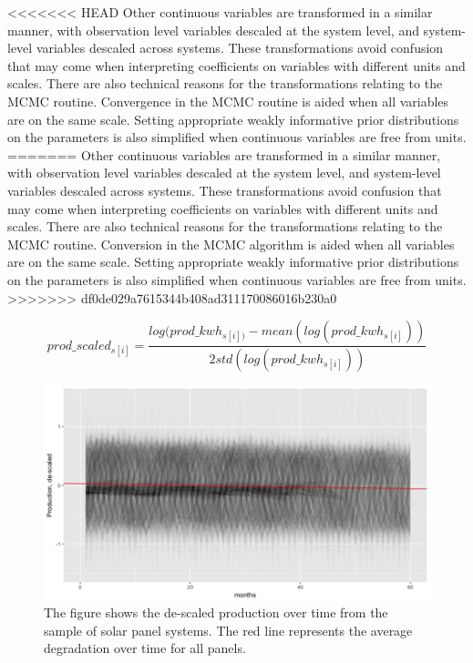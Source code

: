 \documentclass[12pt]{article}
\begin{document}
<<<<<<< HEAD
Other continuous variables are transformed in a similar manner, with observation level variables descaled at the system level, and system-level variables descaled across systems. These transformations avoid confusion that may come when interpreting coefficients on variables with different units and scales. There are also technical reasons for the transformations relating to the MCMC routine. Convergence in the MCMC routine is aided when all variables are on the same scale. Setting appropriate weakly informative prior distributions on the parameters is also simplified when continuous variables are free from units.
=======
Other continuous variables are transformed in a similar manner, with observation level variables descaled at the system level, and system-level variables descaled across systems. These transformations avoid confusion that may come when interpreting coefficients on variables with different units and scales. There are also technical reasons for the transformations relating to the MCMC routine. Conversion in the MCMC algorithm is aided when all variables are on the same scale. Setting appropriate weakly informative prior distributions on the parameters is also simplified when continuous variables are free from units.
>>>>>>> df0de029a7615344b408ad311170086016b230a0

\begin{equation}
prod\_scaled_{s[i]} = \frac{log(prod\_kwh_{s[i])} - mean(log(prod\_kwh_{s[i]}))}{2 std(log(prod\_kwh_{s[i]}))}
\label{eqn:descaled}
\end{equation}

\begin{figure}
  \includegraphics[width=1\linewidth]{figures/production.png}
  \caption{The figure shows the de-scaled production over time from the sample of solar panel systems. The red line represents the average degradation over time for all panels.}
  \label{fig:production}
\end{figure}
\end{document}
